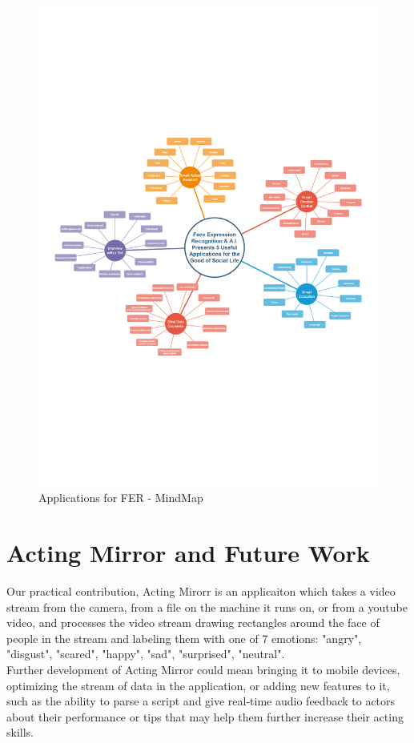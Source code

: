 \documentclass[runningheads,a4paper,11pt]{report}
\begin{document}
\begin{figure}[htbp]
\begin{center}
	\includegraphics[scale=0.77]{Fig/FER-MindMap.pdf}
	\caption{Applications for FER - MindMap}
	\label{FER-MindMap}
\end{center}
\end{figure}

\clearpage
\section{Acting Mirror and Future Work}
\label{section:acting_mirror_and_future_work}

Our practical contribution, Acting Mirorr is an applicaiton which takes a video stream from the camera, from a file on the machine it runs on, or from a youtube video, and processes the video stream drawing rectangles around the face of people in the stream and labeling them with one of 7 emotions: "angry", "disgust", "scared", "happy", "sad", "surprised", "neutral".\\
Further development of Acting Mirror could mean bringing it to mobile devices, optimizing the stream of data in the application, or adding new features to it, such as the ability to parse a script and give real-time audio feedback to actors about their performance or tips that may help them further increase their acting skills.\\
\end{document}
